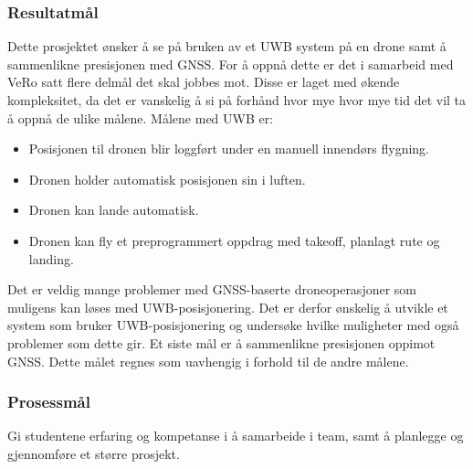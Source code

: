 \subsubsection{Resultatmål}
Dette prosjektet ønsker å se på bruken av et UWB system på en drone samt å sammenlikne presisjonen med GNSS. For å oppnå dette er det i samarbeid med VeRo satt flere delmål det skal jobbes mot. Disse er laget med økende kompleksitet, da det er vanskelig å si på forhånd hvor mye hvor mye tid det vil ta å oppnå de ulike målene. Målene med UWB er:
\begin{itemize}
    \item Posisjonen til dronen blir loggført under en manuell innendørs flygning.
    \item Dronen holder automatisk posisjonen sin i luften.
    \item Dronen kan lande automatisk.
    \item Dronen kan fly et preprogrammert oppdrag med takeoff, planlagt rute og landing.
\end{itemize}
Det er veldig mange problemer med GNSS-baserte droneoperasjoner som muligens kan løses med UWB-posisjonering. Det er derfor ønskelig å utvikle et system som bruker UWB-posisjonering og undersøke hvilke muligheter med også problemer som dette gir.
Et siste mål er å sammenlikne presisjonen oppimot GNSS. Dette målet regnes som uavhengig i forhold til de andre målene.

\subsubsection{Prosessmål}
Gi studentene erfaring og kompetanse i å samarbeide i team, samt å planlegge og gjennomføre et større prosjekt.